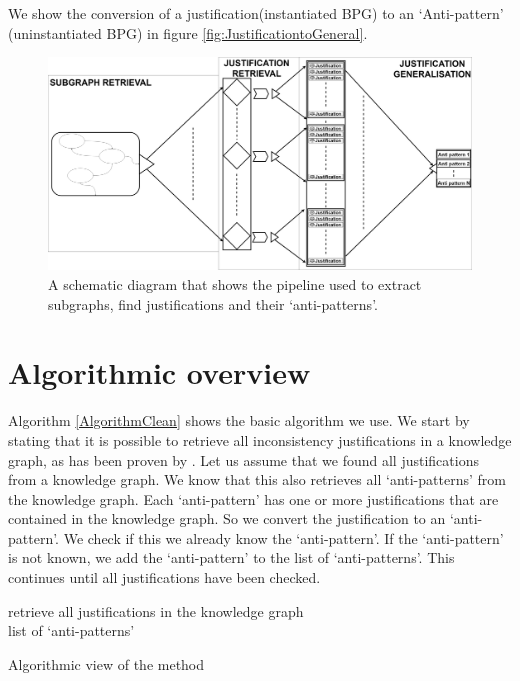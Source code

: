 \documentclass[11pt,letterpaper ,oneside ]{book}
\begin{document}
	We show the conversion of a justification(instantiated BPG) to an `Anti-pattern' (uninstantiated BPG) in figure \ref{fig:JustificationtoGeneral}.
	
	
	\begin{figure}
		\includegraphics[width=\linewidth]{images/SimplifiedPipelineMissingPart.png}
		\caption{A schematic diagram that shows the pipeline used to extract subgraphs, find justifications and their `anti-patterns'.}
		\label{fig:simplePipeline}
	\end{figure}
	
	\section{Algorithmic overview}
	Algorithm \ref{AlgorithmClean} shows the basic algorithm we use. We start by stating that it is possible to retrieve all inconsistency justifications in a knowledge graph, as has been proven by \cite{Horridge:2009}. Let us assume that we found all justifications from a knowledge graph. We know that this also retrieves all `anti-patterns' from the knowledge graph. Each `anti-pattern' has one or more justifications that are contained in the knowledge graph. So we convert the justification to an `anti-pattern'. We check if this we already know the `anti-pattern'. If the `anti-pattern' is not known, we add the `anti-pattern' to the list of `anti-patterns'. This continues until all justifications have been checked.\\
	
	\begin{algorithm}
		
		retrieve all justifications in the knowledge graph\\
		\Return list of `anti-patterns'\\
		\label{AlgorithmClean}
		\caption{Algorithmic view of the method}
	\end{algorithm}
	
\end{document}
